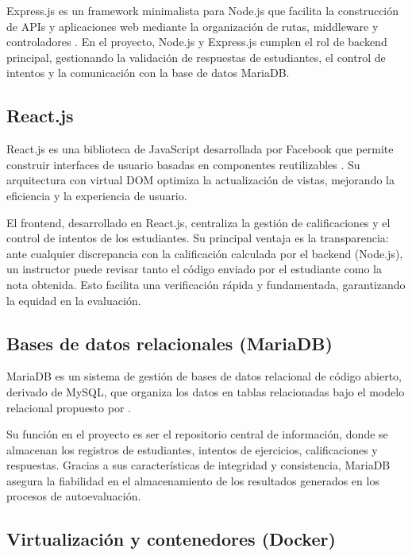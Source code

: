 \documentclass[letter,oneside,12pt,spanish]{report}
\begin{document}
Express.js es un framework minimalista para Node.js que facilita la construcción de APIs y aplicaciones web mediante la organización de rutas, middleware y controladores \parencite{brown2019}. En el proyecto, Node.js y Express.js cumplen el rol de backend principal, gestionando la validación de respuestas de estudiantes, el control de intentos y la comunicación con la base de datos MariaDB.

\subsection{React.js}

React.js es una biblioteca de JavaScript desarrollada por Facebook que permite construir interfaces de usuario basadas en componentes reutilizables \parencite{banks2017}. Su arquitectura con virtual DOM optimiza la actualización de vistas, mejorando la eficiencia y la experiencia de usuario.

El frontend, desarrollado en React.js, centraliza la gestión de calificaciones y el control de intentos de los estudiantes. Su principal ventaja es la transparencia: ante cualquier discrepancia con la calificación calculada por el backend (Node.js), un instructor puede revisar tanto el código enviado por el estudiante como la nota obtenida. Esto facilita una verificación rápida y fundamentada, garantizando la equidad en la evaluación.

\subsection{Bases de datos relacionales (MariaDB)}

MariaDB es un sistema de gestión de bases de datos relacional de código abierto, derivado de MySQL, que organiza los datos en tablas relacionadas bajo el modelo relacional propuesto por \textcite{codd1970}.

Su función en el proyecto es ser el repositorio central de información, donde se almacenan los registros de estudiantes, intentos de ejercicios, calificaciones y respuestas. Gracias a sus características de integridad y consistencia, MariaDB asegura la fiabilidad en el almacenamiento de los resultados generados en los procesos de autoevaluación.

\subsection{Virtualización y contenedores (Docker)}
\end{document}
